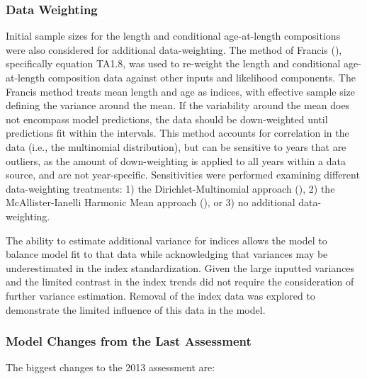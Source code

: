 \documentclass[
]{scrartcl}
\begin{document}
\subsubsection{Data Weighting}\label{data-weighting}

Initial sample sizes for the length and conditional age-at-length
compositions were also considered for additional data-weighting. The
method of Francis (), specifically
equation TA1.8, was used to re-weight the length and conditional
age-at-length composition data against other inputs and likelihood
components. The Francis method treats mean length and age as indices,
with effective sample size defining the variance around the mean. If the
variability around the mean does not encompass model predictions, the
data should be down-weighted until predictions fit within the intervals.
This method accounts for correlation in the data (i.e., the multinomial
distribution), but can be sensitive to years that are outliers, as the
amount of down-weighting is applied to all years within a data source,
and are not year-specific. Sensitivities were performed examining
different data-weighting treatments: 1) the Dirichlet-Multinomial
approach (), 2) the McAllister-Ianelli Harmonic Mean approach
(),
or 3) no additional data-weighting.

The ability to estimate additional variance for indices allows the model
to balance model fit to that data while acknowledging that variances may
be underestimated in the index standardization. Given the large inputted
variances and the limited contrast in the index trends did not require
the consideration of further variance estimation. Removal of the index
data was explored to demonstrate the limited influence of this data in
the model.

\subsubsection{Model Changes from the Last
Assessment}\label{model-changes-from-the-last-assessment}

The biggest changes to the 2013 assessment are:
\end{document}
